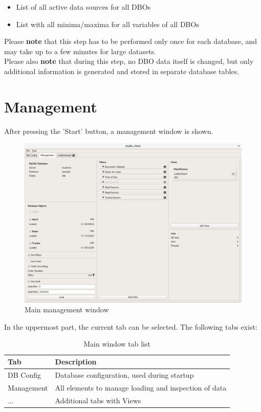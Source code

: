 \documentclass[10pt,letterpaper,extrafontsizes]{memoir}
\begin{document}
\begin{itemize}  
\item List of all active data sources for all DBOs
\item List with all minima/maxima for all variables of all DBOs
\end{itemize}

Please \textbf{note} that this step has to be performed only once for each database, and may take up to a few minutes for large datasets. \\

Please also \textbf{note} that during this step, no DBO data itself is changed, but only additional information is generated and stored in separate database tables.

\section{Management}
\label{sec:management}

After pressing the 'Start' button, a management window is shown.

\begin{figure}[H]
  \hspace*{-2cm}
    \includegraphics[width=18cm]{../screenshots/management.png}
  \caption{Main management window}
  \label{fig:management}
\end{figure}

In the uppermost part, the current tab can be selected. The following tabs exist:

\begin{table}[h]
  \center
  \begin{tabular}{ | l | l |}
    \hline
    \textbf{Tab} & \textbf{Description} \\ \hline
    DB Config & Database configuration, used during startup \\ \hline
    Management & All elements to manage loading and inspection of data \\ \hline
    ... & Additional tabs with Views \\
    \hline
  \end{tabular}
  \caption{Main window tab list}
\end{table}
\end{document}
